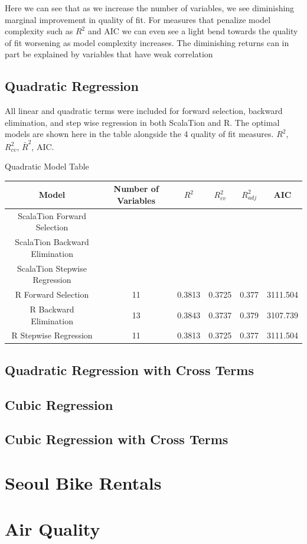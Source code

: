 \documentclass{article}
\begin{document}
	
	Here we can see that as we increase the number of variables, we see diminishing marginal improvement in quality of 
	fit. For measures that penalize model complexity such as $R^2$ and AIC we can even see a light bend towards 
	the quality of fit worsening as model complexity increases. The diminishing returns can in part be explained by 
	variables that have weak correlation 
	
	
	
	\subsection{Quadratic Regression} 
	
	All linear and quadratic terms were included for forward selection, backward elimination, 
	and step wise regression in both ScalaTion and R. The optimal models are shown here 
	in the table alongside the 4 quality of fit measures. $R^2$, $R^2_{cv}$, $\bar R^2$, AIC. 
	
	\begin{center}
	Quadratic Model Table
	
	\begin{tabular}{|c|c|c|c|c|c|}
		\hline
		Model & Number of Variables & $R^2$ & $R^2_{cv}$ & $R^2_{adj}$ & AIC \\ 
		\hline
		ScalaTion Forward Selection & & & & & \\
		\hline
		ScalaTion Backward Elimination & & & & & \\
		\hline
		ScalaTion Stepwise Regression & & & & & \\
		\hline
		R Forward Selection & 11 & 0.3813 & 0.3725 & 0.377 & 3111.504\\
		\hline
		R Backward Elimination & 13 & 0.3843 & 0.3737 & 0.379 & 3107.739\\
		\hline
		R Stepwise Regression & 11 & 0.3813 & 0.3725 & 0.377 & 3111.504 \\
		\hline
	\end{tabular}
	\end{center}

	\subsection{Quadratic Regression with Cross Terms} 
	\subsection{Cubic Regression} 
	\subsection{Cubic Regression with Cross Terms} 
	
	
	\section{Seoul Bike Rentals}
	\section{Air Quality}
	
	
\end{document}
